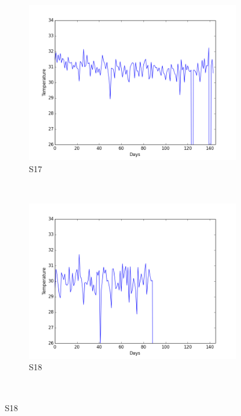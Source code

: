 \documentclass[12pt]{article} %
\begin{document}
\begin{figure}[H]
    \begin{subfigure}[b]{0.2\textwidth}
        \includegraphics[width=\textwidth]{img/graphs/17-skintemp-1}
        \caption{S17}
        \label{fig:s17ST}
    \end{subfigure}
    ~ %
    \begin{subfigure}[b]{0.2\textwidth}
        \includegraphics[width=\textwidth]{img/graphs/18-skintemp-1}
        \caption{S18}
        \label{fig:s18ST}
    \end{subfigure}
    ~ %

\end{figure}
\end{document}
